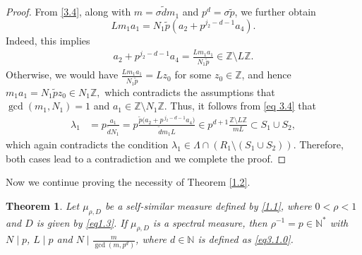 \documentclass[11pt]{article}
\newtheorem{theorem}{Theorem}[section]
\numberwithin{equation}{section}
\begin{document}
\begin{proof}
From \eqref{3.4}, along with  $m=\sigma \tilde{d}m_1$ and $p^d=\sigma \tilde{p}$, we further obtain
$$L m_1 a_1 = N_1 \tilde{p}\left( a_2 + p^{j_2 - d - 1} a_4 \right).$$
Indeed, this implies
\begin{align}\label{eq 3.4}
a_2 + p^{j_2 - d-1}  a_4=\frac{Lm_1a_1}{N_1\tilde{p}} \in\mathbb{Z}\setminus L\mathbb{Z}.
\end{align}
Otherwise, we would have $\frac{L m_1 a_1}{N_1 \tilde{p}} = L z_0$
for some $z_0 \in \mathbb{Z}$, and hence
$
m_1 a_1 = N_1 \tilde{p} z_0 \in N_1 \mathbb{Z},
$
which contradicts the assumptions that $\gcd(m_1, N_1)=1$ and
$a_1 \in \mathbb{Z} \setminus N_1 \mathbb{Z}$.
 Thus, it follows from \eqref{eq 3.4} that
 \begin{align*}
	\lambda_1
	&= p\frac{a_1}{\tilde{d} N_1}= p\frac{\tilde{p}\big(a_2 + p^{\,j_2-d-1} a_4\big)}{\tilde{d} m_1 L} \in p^{d+1}\frac{\mathbb{Z}\setminus L\mathbb{Z}}{mL}
	\subset S_1 \cup S_2,
\end{align*}
which again contradicts the condition $\lambda_1 \in \Lambda \cap \left( R_1 \setminus (S_1 \cup S_2) \right)$.
Therefore, both cases lead to a contradiction and we complete the proof.


\end{proof}

Now we continue proving the necessity of Theorem \ref{1.2}.

\begin{theorem}\label{thm3.2}
Let $\mu_{\rho,D}$ be a self-similar measure defined by \eqref{1.1}, where $0<\rho<1$ and $D$ is given by \eqref{eq1.3}. If $\mu_{\rho,D}$ is a spectral measure, then $\rho^{-1}=p\in\mathbb{N}^*$ with $N\mid p$, $L\mid p$ and $N\mid\frac{m}{\gcd(m,p^d)}$, where $d \in \mathbb{N}$ is defined as \eqref{eq3.1.0}.
\end{theorem}
\end{document}
